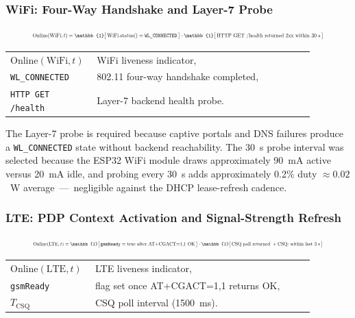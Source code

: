 \subsubsection{WiFi: Four-Way Handshake and Layer-7 Probe}
\label{sec:online_wifi}
\begin{equation}
\resizebox{0.88\linewidth}{!}{$\displaystyle
\mathrm{Online}(\text{WiFi}, t) = \mathbb{1}\bigl[\, \text{WiFi.status()} = \texttt{WL\_CONNECTED} \,\bigr] \cdot \mathbb{1}\bigl[\, \text{HTTP GET}\ /\text{health}\ \text{returned 2xx within 30~s} \,\bigr]
$}
\label{eq:online_wifi}
\end{equation}
\noindent\begin{tabular}{@{}p{0.20\linewidth}@{\quad}p{0.68\linewidth}@{}}
$\mathrm{Online}(\text{WiFi},t)$ & WiFi liveness indicator, \\
\texttt{WL\_CONNECTED} & 802.11 four-way handshake completed, \\
\texttt{HTTP GET /health} & Layer-7 backend health probe.
\end{tabular}

\vspace{0.5em}
The Layer-7 probe is required because captive portals and DNS failures produce a \texttt{WL\_CONNECTED} state without backend reachability. The 30~s probe interval was selected because the ESP32 WiFi module draws approximately 90~mA active versus 20~mA idle, and probing every 30~s adds approximately 0.2\% duty $\approx 0.02$~W average~---~negligible against the DHCP lease-refresh cadence.

\subsubsection{LTE: PDP Context Activation and Signal-Strength Refresh}
\label{sec:online_lte}
\begin{equation}
\resizebox{0.88\linewidth}{!}{$\displaystyle
\mathrm{Online}(\text{LTE}, t) = \mathbb{1}\bigl[\, \texttt{gsmReady} = \text{true after AT+CGACT=1,1 OK} \,\bigr] \cdot \mathbb{1}\bigl[\, \text{CSQ poll returned }+\text{CSQ:}\text{ within last }3\text{ s} \,\bigr]
$}
\label{eq:online_lte}
\end{equation}
\noindent\begin{tabular}{@{}p{0.20\linewidth}@{\quad}p{0.68\linewidth}@{}}
$\mathrm{Online}(\text{LTE},t)$ & LTE liveness indicator, \\
\texttt{gsmReady} & flag set once AT+CGACT=1,1 returns OK, \\
$T_{\text{CSQ}}$ & CSQ poll interval (1500~ms).
\end{tabular}

